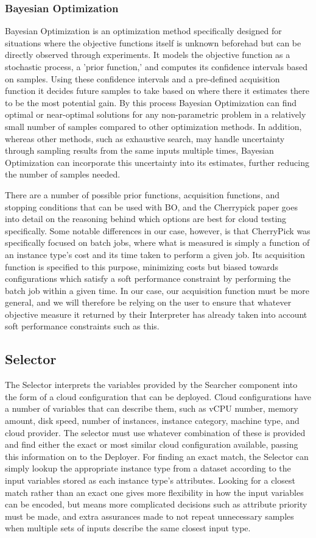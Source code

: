 \documentclass{article}
\begin{document}
\subsubsection{Bayesian Optimization}
Bayesian Optimization is an optimization method specifically designed for situations where the objective functions itself is unknown beforehad but can be directly observed through experiments. It models the objective function as a stochastic process, a 'prior function,' and computes its confidence intervals based on samples. Using these confidence intervals and a pre-defined acquisition function it decides future samples to take based on where there it estimates there to be the most potential gain. By this process Bayesian Optimization can find optimal or near-optimal solutions for any non-parametric problem in a relatively small number of samples compared to other optimization methods. In addition, whereas other methods, such as exhaustive search, may handle uncertainty through sampling results from the same inputs multiple times, Bayesian Optimization can incorporate this uncertainty into its estimates, further reducing the number of samples needed.

There are a number of possible prior functions, acquisition functions, and stopping conditions that can be used with BO, and the Cherrypick paper goes into detail on the reasoning behind which options are best for cloud testing specifically. Some notable differences in our case, however, is that CherryPick was specifically focused on batch jobs, where what is measured is simply a function of an instance type's cost and its time taken to perform a given job. Its acquisition function is specified to this purpose, minimizing costs but biased towards configurations which satisfy a soft performance constraint by performing the batch job within a given time. In our case, our acquisition function must be more general, and we will therefore be relying on the user to ensure that whatever objective measure it returned by their Interpreter has already taken into account soft performance constraints such as this.

\subsection{Selector}
The Selector interprets the variables provided by the Searcher component into the form of a cloud configuration that can be deployed. Cloud configurations have a number of variables that can describe them, such as vCPU number, memory amount, disk speed, number of instances, instance category, machine type, and cloud provider. The selector must use whatever combination of these is provided and find either the exact or most similar cloud configuration available, passing this information on to the Deployer. For finding an exact match, the Selector can simply lookup the appropriate instance type from a dataset according to the input variables stored as each instance type's attributes. Looking for a closest match rather than an exact one gives more flexibility in how the input variables can be encoded, but means more complicated decisions such as attribute priority must be made, and extra assurances made to not repeat unnecessary samples when multiple sets of inputs describe the same closest input type.
\end{document}
